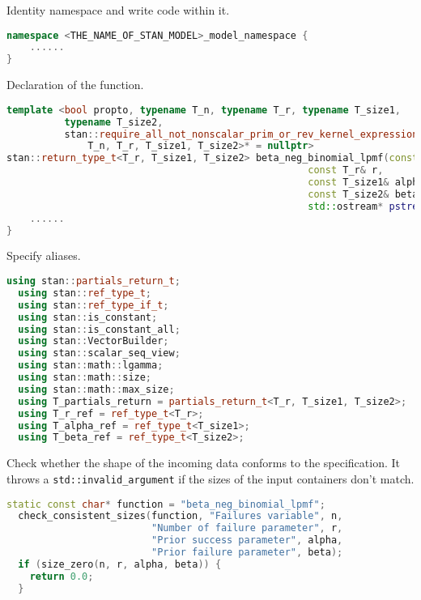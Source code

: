 \documentclass[11pt]{article}
\begin{document}
\begin{comment}
We'll look at how to use template function in combination with the gradient interface. Thanks to the powerful generic mechanism of C++, we only need to write one function instead of writing it for each input type permutation.
\end{comment}

Identity namespace and write code within it.
\begin{lstlisting}[language=c++, style=lgeneral]
namespace <THE_NAME_OF_STAN_MODEL>_model_namespace {
	......
}
\end{lstlisting}


Declaration of the function.
\begin{lstlisting}[language=c++, style=lgeneral]
template <bool propto, typename T_n, typename T_r, typename T_size1,
          typename T_size2,
          stan::require_all_not_nonscalar_prim_or_rev_kernel_expression_t<
              T_n, T_r, T_size1, T_size2>* = nullptr>
stan::return_type_t<T_r, T_size1, T_size2> beta_neg_binomial_lpmf(const T_n& n, 
                                                    const T_r& r,
                                                    const T_size1& alpha,
                                                    const T_size2& beta,
                                                    std::ostream* pstream__) {	
	......
}
\end{lstlisting}


Specify aliases.
\begin{lstlisting}[language=c++, style=lgeneral]
  using stan::partials_return_t;
  using stan::ref_type_t;
  using stan::ref_type_if_t;
  using stan::is_constant;
  using stan::is_constant_all;
  using stan::VectorBuilder;
  using stan::scalar_seq_view;
  using stan::math::lgamma;
  using stan::math::size;
  using stan::math::max_size;	
  using T_partials_return = partials_return_t<T_r, T_size1, T_size2>;
  using T_r_ref = ref_type_t<T_r>;
  using T_alpha_ref = ref_type_t<T_size1>;
  using T_beta_ref = ref_type_t<T_size2>;
\end{lstlisting}



Check whether the shape of the incoming data conforms to the specification. It throws a \verb|std::invalid_argument| if the sizes of the input containers don't match.
\begin{lstlisting}[language=c++, style=lgeneral]
  static const char* function = "beta_neg_binomial_lpmf";
  check_consistent_sizes(function, "Failures variable", n,
                         "Number of failure parameter", r,
                         "Prior success parameter", alpha,
                         "Prior failure parameter", beta);
  if (size_zero(n, r, alpha, beta)) {
    return 0.0;
  }
\end{lstlisting}
\end{document}
